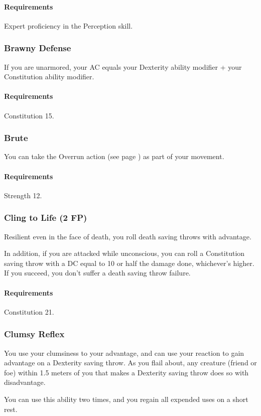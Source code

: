     \paragraph{Requirements} Expert proficiency in the Perception skill.
\subsubsection{Brawny Defense} \label{feat::brawnydefense}
    If you are unarmored, your AC equals your Dexterity ability modifier + your Constitution ability modifier.
    \paragraph{Requirements} Constitution 15.
\subsubsection{Brute} \label{feat::brute}
    You can take the Overrun action (see page \pageref{act::overrun}) as part of your movement.
    \paragraph{Requirements} Strength 12.
\subsubsection{Cling to Life (2 FP)} \label{feat::clingtolife}
    Resilient even in the face of death, you roll death saving throws with advantage.

    In addition, if you are attacked while unconscious, you can roll a Constitution saving throw with a DC equal to 10 or half the damage done, whichever's higher.
    If you succeed, you don't suffer a death saving throw failure.
    \paragraph{Requirements} Constitution 21.
\subsubsection{Clumsy Reflex} \label{feat::clumsyreflex}
    You use your clumsiness to your advantage, and can use your reaction to gain advantage on a Dexterity saving throw.
    As you flail about, any creature (friend or foe) within 1.5 meters of you that makes a Dexterity saving throw does so with disadvantage.

    You can use this ability two times, and you regain all expended uses on a short rest.

